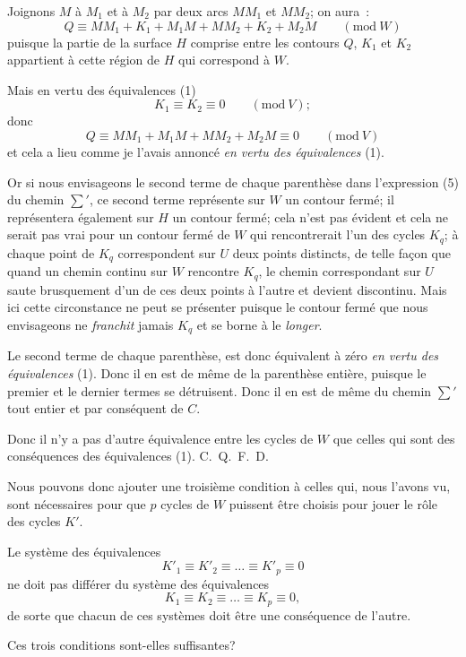 \documentclass{article}
\begin{document}
Joignons $M$ à $M_{1}$ et à $M_{2}$ par deux arcs $MM_{1}$ et $MM_{2}$; on aura~:
\[ Q \equiv MM_{1} + K_{1} + M_{1}M + MM_{2} + K_{2} + M_{2}M \qquad (\text{mod}\ W) \]
puisque la partie de la surface $H$ comprise entre les contours $Q$, $K_{1}$ et $K_{2}$ appartient à cette région de $H$ qui correspond à $W$.

Mais en vertu des équivalences (1)
\[ K_{1} \equiv K_{2} \equiv 0 \qquad (\text{mod}\ V); \]
donc
\[ Q \equiv MM_{1} + M_{1}M + MM_{2} + M_{2}M \equiv 0 \qquad (\text{mod}\ V) \]
et cela a lieu comme je l'avais annoncé \emph{en vertu des équivalences} (1).


Or si nous envisageons le second terme de chaque parenthèse dans l'expression (5) du chemin $\displaystyle\sum'$, ce second terme représente sur $W$ un contour fermé; il représentera également sur $H$ un contour fermé; cela n'est pas évident et cela ne serait pas vrai pour un contour fermé de $W$ qui rencontrerait l'un des cycles $K_{q}$; à chaque point de $K_{q}$ correspondent sur $U$ deux points distincts, de telle façon que quand un chemin continu sur $W$ rencontre $K_{q}$, le chemin correspondant sur $U$ saute brusquement d'un de ces deux points à l'autre et devient discontinu. Mais ici cette circonstance ne peut se présenter puisque le contour fermé que nous envisageons ne \emph{franchit} jamais $K_{q}$ et se borne à le \emph{longer}.

Le second terme de chaque parenthèse, est donc équivalent à zéro \emph{en vertu des équivalences} (1). Donc il en est de même de la parenthèse entière, puisque le premier et le dernier termes se détruisent. Donc il en est de même du chemin $\displaystyle\sum'$ tout entier et par conséquent de $C$.

Donc il n'y a pas d'autre équivalence entre les cycles de $W$ que celles qui sont des conséquences des équivalences (1). C.~Q.~F.~D.

Nous pouvons donc ajouter une troisième condition à celles qui, nous l'avons vu, sont nécessaires pour que $p$ cycles de $W$ puissent être choisis pour jouer le rôle des cycles $K'$.

Le système des équivalences
\[ K'_{1} \equiv K'_{2} \equiv \ldots \equiv K'_{p} \equiv 0 \]
ne doit pas différer du système des équivalences
\[ K_{1} \equiv K_{2} \equiv \ldots \equiv K_{p} \equiv 0, \]
de sorte que chacun de ces systèmes doit être une conséquence de l'autre.

Ces trois conditions sont-elles suffisantes?
\end{document}
